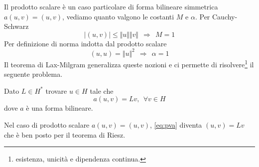 \documentclass[10pt,a4paper,twoside,openright]{book}
\begin{document}
Il prodotto scalare è un caso particolare di forma bilineare simmetrica $a(u,v) =(u,v)$, vediamo quanto valgono le costanti $M$ e $\alpha $. Per Cauchy-Schwarz
\begin{equation*}
    | (u,v)| \leqslant \Vert u\Vert \Vert v\Vert \ \ \Rightarrow \ \ M=1
\end{equation*}
Per definizione di norma indotta dal prodotto scalare
\begin{equation*}
    (u,u) =\Vert u\Vert ^{2} \ \ \Rightarrow \ \ \alpha =1
\end{equation*}
Il teorema di Lax-Milgram generalizza queste nozioni e ci permette di risolvere\footnote{esistenza, unicità e dipendenza continua.} il seguente problema.
\begin{definition}
     Dato $L\in H^{*}$ trovare $u\in H$ tale che
    \begin{equation}
        \tag{PVA}
        a(u,v) =Lv,\ \ \forall v\in H
        \label{eq:pva}
    \end{equation}
    dove $a$ è una forma bilineare.
\end{definition}
Nel caso di prodotto scalare $a(u,v) =(u,v)$, \eqref{eq:pva} diventa $(u,v) =Lv$ che è ben posto per il teorema di Riesz.
\end{document}
